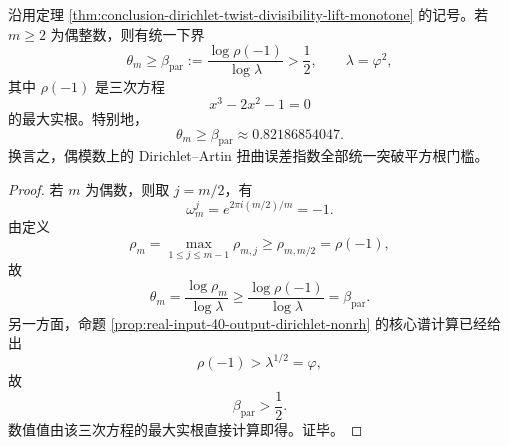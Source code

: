 \begin{theorem}[偶模数上的平方根律统一失效]\label{thm:conclusion-dirichlet-even-modulus-uniform-parity-obstruction}
沿用定理 \ref{thm:conclusion-dirichlet-twist-divisibility-lift-monotone} 的记号。若 \(m\ge 2\) 为偶整数，则有统一下界
\[
\theta_m\ge \beta_{\mathrm{par}}
:=
\frac{\log \rho(-1)}{\log\lambda}
>
\frac12,
\qquad
\lambda=\varphi^2,
\]
其中 \(\rho(-1)\) 是三次方程
\[
x^3-2x^2-1=0
\]
的最大实根。特别地，
\[
\theta_m\ge \beta_{\mathrm{par}}\approx 0.82186854047.
\]
换言之，偶模数上的 Dirichlet--Artin 扭曲误差指数全部统一突破平方根门槛。
\end{theorem}
\begin{proof}
若 \(m\) 为偶数，则取 \(j=m/2\)，有
\[
\omega_m^j=e^{2\pi i(m/2)/m}=-1.
\]
由定义
\[
\rho_m=\max_{1\le j\le m-1}\rho_{m,j}\ge \rho_{m,m/2}=\rho(-1),
\]
故
\[
\theta_m=\frac{\log \rho_m}{\log\lambda}\ge \frac{\log \rho(-1)}{\log\lambda}=\beta_{\mathrm{par}}.
\]
另一方面，命题 \ref{prop:real-input-40-output-dirichlet-nonrh} 的核心谱计算已经给出
\[
\rho(-1)>\lambda^{1/2}=\varphi,
\]
故
\[
\beta_{\mathrm{par}}>\frac12.
\]
数值值由该三次方程的最大实根直接计算即得。证毕。
\end{proof}

